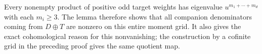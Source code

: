 Every nonempty product of positive odd target weights
has eigenvalue $u^{m_1+\cdots+m_d}$ with each $m_i\geq3$.
The lemma therefore shows that all companion denominators
coming from $D\oplus T$ are nonzero on this entire
moment grid. It also gives the exact cohomological reason
for this nonvanishing; the construction by a cofinite
grid in the preceding proof gives the same quotient map.
